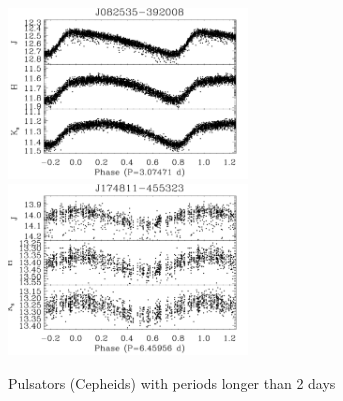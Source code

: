 \documentclass[]{emulateapj}
\begin{document}
\begin{figure}[]
\centering
\includegraphics[width=2.5in]{new_plots/rr_9}
\includegraphics[width=2.5in]{new_plots/rr_10}
\caption{Pulsators (Cepheids)  with periods longer than 2 days}
\label{rrlong}
\end{figure}


 
 \clearpage
\end{document}
